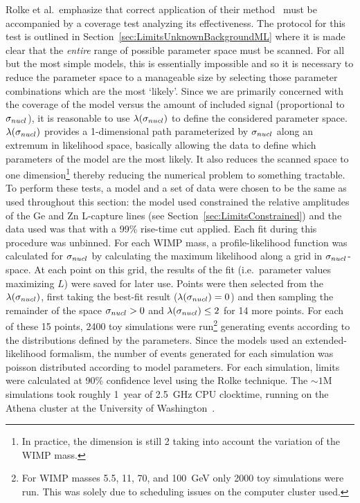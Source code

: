 Rolke et al.~emphasize that correct application of their method~\cite{Rol05} must be accompanied by a coverage test analyzing its effectiveness.  The protocol for this test is outlined in Section~\ref{sec:LimitsUnknownBackgroundML} where it is made clear that the \emph{entire} range of possible parameter space must be scanned.  For all but the most simple models, this is essentially impossible and so it is necessary to reduce the parameter space to a manageable size by selecting those parameter combinations which are the most `likely'.  Since we are primarily concerned with the coverage of the model versus the amount of included signal (proportional to $\sigma_{nucl}$), it is reasonable to use $\lambda(\sigma_{nucl})$ to define the considered parameter space.  $\lambda(\sigma_{nucl})$ provides a 1-dimensional path parameterized by $\sigma_{nucl}$ along an extremum in likelihood space, basically allowing the data to define which parameters of the model are the most likely.  It also reduces the scanned space to one dimension\footnote{In practice, the dimension is still 2 taking into account the variation of the WIMP mass.} thereby reducing the numerical problem to something tractable.  
To perform these tests, a model and a set of data were chosen to be the same as used throughout this section: the model used constrained the relative amplitudes of the Ge and Zn L-capture lines (see Section~\ref{sec:LimitsConstrained}) and the data used was that with a 99\% rise-time cut applied.  Each fit during this procedure was unbinned.  For each WIMP mass, a profile-likelihood function was calculated for $\sigma_{nucl}$ by calculating the maximum likelihood along a grid in $\sigma_{nucl}$-space.  At each point on this grid, the results of the fit (i.e.~parameter values maximizing $L$) were saved for later use.  Points were then selected from the $\lambda(\sigma_{nucl})$, first taking the best-fit result ($\lambda(\sigma_{nucl}) = 0$) and then sampling the remainder of the space $\sigma_{nucl} > 0$ and $\lambda(\sigma_{nucl}) \leq 2$ for 14 more points.  For each of these 15 points, 2400 toy simulations were run\footnote{For WIMP masses 5.5, 11, 70, and 100~GeV only 2000 toy simulations were run.  This was solely due to scheduling issues on the computer cluster used.} generating events according to the distributions defined by the parameters.  Since the models used an extended-likelihood formalism, the number of events generated for each simulation was poisson distributed according to model parameters.  For each simulation, limits were calculated at 90\% confidence level using the Rolke technique.  The $\sim1$M simulations took roughly 1~year of 2.5~GHz CPU clocktime, running on the Athena cluster at the University of Washington~\cite{Athena}.  

